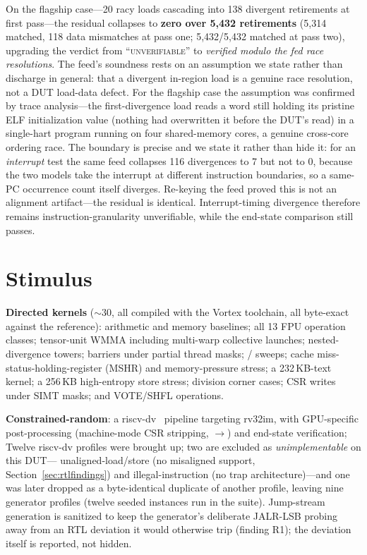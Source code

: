 \documentclass[conference]{IEEEtran}
\newcommand{\code}[1]{\texttt{\detokenize{#1}}}
\begin{document}
On the flagship case---20 racy loads cascading into 138 divergent
retirements at first pass---the residual collapses to \textbf{zero over
	5{,}432 retirements} (5{,}314 matched, 118 data mismatches at pass one;
5{,}432/5{,}432 matched at pass two), upgrading the verdict from
``\textsc{unverifiable}'' to \emph{verified modulo the fed race
	resolutions}. The feed's soundness rests on an assumption we state
rather than discharge in general: that a divergent in-region load is a
genuine race resolution, not a DUT load-data defect. For the flagship
case the assumption was confirmed by trace analysis---the
first-divergence load reads a word still holding its pristine ELF
initialization value (nothing had overwritten it before the DUT's
read) in a single-hart program running on four shared-memory cores, a
genuine cross-core ordering race. The
boundary is precise and we state it rather than hide it: for an
\emph{interrupt} test the same feed collapses 116 divergences to 7 but
not to 0, because the two models take the interrupt at different
instruction boundaries, so a same-PC occurrence count itself diverges.
Re-keying the feed proved this is not an alignment artifact---the
residual is identical. Interrupt-timing divergence therefore remains
instruction-granularity unverifiable, while the end-state comparison
still passes.

\section{Stimulus}
\label{sec:stimulus}

\textbf{Directed kernels} (${\sim}30$, all compiled with the Vortex
toolchain, all byte-exact against the reference): arithmetic and memory
baselines; all 13 FPU operation classes; tensor-unit WMMA including
multi-warp collective launches; nested-divergence towers; barriers under
partial thread masks; \code{wspawn}/\code{tmc} sweeps; cache
miss-status-holding-register (MSHR) and memory-pressure stress; a
232\,KB-text kernel; a 256\,KB high-entropy store stress; division
corner cases; CSR writes under SIMT masks; and VOTE/SHFL operations.

\textbf{Constrained-random}: a riscv-dv~\cite{riscvdv} pipeline
targeting rv32im, with GPU-specific post-processing (machine-mode CSR
stripping, \code{ecall}$\to$\code{ebreak}) and end-state verification;
Twelve riscv-dv profiles were brought up; two are excluded as
\emph{unimplementable} on this DUT---%
unaligned-load/store (no misaligned support,
Section~\ref{sec:rtlfindings}) and illegal-instruction (no trap
architecture)---and one was later dropped as a byte-identical
duplicate of another profile, leaving nine generator profiles (twelve
seeded instances run in the suite). Jump-stream generation is
sanitized to keep the
generator's deliberate JALR-LSB probing away from an RTL deviation it
would otherwise trip (finding R1); the deviation itself is reported, not
hidden.
\end{document}
